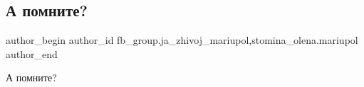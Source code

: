  
 
 
 
 

\subsection{А помните?}
\label{sec:21_03_2023.fb.fb_group.ja_zhivoj_mariupol.1.a_pomnite_}
 
\ifcmt
 author_begin
   author_id fb_group.ja_zhivoj_mariupol,stomina_olena.mariupol
 author_end
\fi

А помните?
